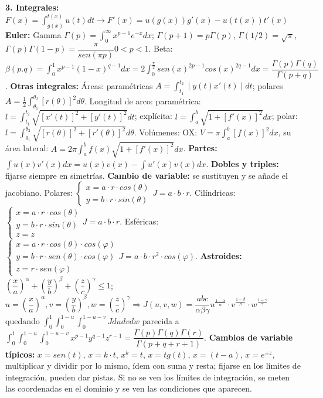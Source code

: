 \documentclass[a4paper, landscape, 11pt]{article}
\begin{document}
\textbf{3. Integrales:} ${\displaystyle F(x) = \int_{g(x)}^{t(x)}u(t)dt \rightarrow F'(x) = u(g(x))g'(x) - u(t(x))t'(x)}$ \textbf{Euler:} Gamma $\Gamma(p) = {\displaystyle \int_{0}^{\infty} x^{p-1} e^{-x} dx}$; $\Gamma(p + 1) = p \Gamma(p)$, $\Gamma(1/2) = \sqrt{\pi}$, $\Gamma(p) \Gamma(1-p) = \dfrac{\pi}{sen(\pi p)} 0<p<1$. Beta: $\beta(p.q) = {\displaystyle \int_{0}^{1}x^{p-1} (1-x)^{q-1}dx = 2\int_{0}^{\frac{\pi}{2}}sen(x)^{2p-1} cos(x)^{2q-1} dx = \dfrac{\Gamma(p) \Gamma(q)}{\Gamma(p+q)}}$. \textbf{Otras integrales:} Áreas: paramétricas $A = \int_{t_1}^{t_2}\mid y(t) x'(t) \mid dt$; polares $A = \frac{1}{2} \int_{\theta_1}^{\theta_2}[r(\theta)]^{2} d\theta$. Longitud de arco: paramétrica: $l = \int_{t_1}^{t_2} \sqrt{[x'(t)]^{2} + [y'(t)]^{2}}dt$; explícita: $l = \int_{a}^{b} \sqrt{1 + [f'(x)]^{2}}dx$; polar: $l = \int_{\theta_1}^{\theta_2} \sqrt{[r(\theta)]^{2} + [r'(\theta)]^{2}}d\theta$. Volúmenes: OX: $V = \pi \int_{a}^{b} [f(x)]^{2} dx$, su área lateral: $A = 2\pi \int_{a}^{b} f(x) \sqrt{1 + [f'(x)]^{2}} dx$. \textbf{Partes:} $\int u(x)v'(x) dx = u(x)v(x) - \int u'(x) v(x) dx$. \textbf{Dobles y triples:} fijarse siempre en simetrías. \textbf{Cambio de variable:} se sustituyen y se añade el jacobiano. Polares:
$\left\{
\begin{array}{ll}
x = a\cdot r\cdot cos(\theta) \\
y = b\cdot r\cdot sin(\theta)
\end{array} \right. J = a \cdot b \cdot r$. Cilíndricas: $\left\{
\begin{array}{ll}
x = a\cdot r\cdot cos(\theta) \\
y = b\cdot r\cdot sin(\theta) \\
z = z
\end{array} \right. J = a \cdot b \cdot r$. Esféricas: $\left\{
\begin{array}{ll}
x = a\cdot r\cdot cos(\theta) \cdot cos(\varphi)\\
y = b\cdot r\cdot  sen(\theta) \cdot cos(\varphi)\\
z = r \cdot sen(\varphi)
\end{array} \right. J = a \cdot b \cdot r^{2} \cdot cos(\varphi)$. \textbf{Astroides:} $\left(\dfrac{x}{a}\right)^{\alpha} + \left(\dfrac{y}{b}\right)^{\beta} + \left(\dfrac{z}{c}\right)^{\gamma} \leq 1$; $u = \left(\dfrac{x}{a}\right)^{\alpha}, v = \left(\dfrac{y}{b}\right)^{\beta}, w = \left(\dfrac{z}{c}\right)^{\gamma} \Rightarrow J(u,v,w) = \dfrac{abc}{\alpha \beta \gamma}u^{\frac{1-\alpha}{\alpha}} \cdot v^{\frac{1 - \beta}{\beta}} \cdot w^{\frac{1 - \gamma}{\gamma}}$ quedando ${\displaystyle\int_{0}^{1}\int_{0}^{1-u}\int_{0}^{1-u-v}Jdudvdw}$ parecida a ${\displaystyle\int_{0}^{1}\int_{0}^{1-u}\int_{0}^{1-u-v}x^{p-1}y^{q-1}z^{r-1} = \dfrac{\Gamma(p)\Gamma(q)\Gamma(r)}{\Gamma(p+q+r+1)}}$. \textbf{Cambios de variable típicos:} $x = sen(t)$, $x = k\cdot t$, $x^{k} = t$, $x = tg(t)$, $x = (t - a)$, $x = e^{\pm z}$, multiplicar y dividir por lo mismo, ídem con suma y resta; fijarse en los límites de integración, pueden dar pistas. Si no se ven los límites de integración, se meten las coordenadas en el dominio y se ven las condiciones que aparecen.
\\
\end{document}
